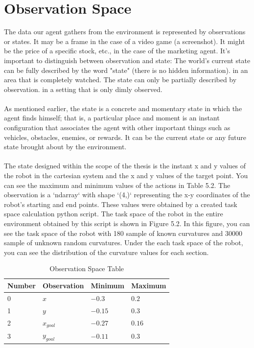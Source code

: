 \documentclass[12pt,twoside,a4]{mwbk}
\begin{document}
\section{Observation Space}
The data our agent gathers from the environment is represented by observations or states. It may be a frame in the case of a video game (a screenshot). It might be the price of a specific stock, etc., in the case of the marketing agent. It's important to distinguish between observation and state: The world's current state can be fully described by the word "state" (there is no hidden information). in an area that is completely watched. The state can only be partially described by observation. in a setting that is only dimly observed.
\\ \\
As mentioned earlier, the state is a concrete and momentary state in which the agent finds himself; that is, a particular place and moment is an instant configuration that associates the agent with other important things such as vehicles, obstacles, enemies, or rewards. It can be the current state or any future state brought about by the environment. 
\\ \\
The state designed within the scope of the thesis is the instant x and y values of the robot in the cartesian system and the x and y values of the target point. You can see the maximum and minimum values of the actions in Table 5.2. The observation is a `ndarray` with shape `(4,)` representing the x-y coordinates of the robot's starting and end points. These values were obtained by a created task space calculation python script. The task space of the robot in the entire environment obtained by this script is shown in Figure 5.2. In this figure, you can see the task space of the robot with 180 sample of known curvatures and 30000 sample of unknown random curvatures. Under the each task space of the robot, you can see the distribution of the curvature values for each section. 
\begin{table}[h!]
\centering
\begin{tabular}{||c c c c||} 
 \hline \hline
 \textbf{Number} & \textbf{Observation} & \textbf{Minimum} & \textbf{Maximum} \\ [0.5ex] 
    \hline\hline
    \multicolumn{1}{|l|}{0} & \multicolumn{1}{l|}{$x$} & \multicolumn{1}{l|}{$-0.3$} & \multicolumn{1}{l|}{$0.2$} \\ \hline
    \multicolumn{1}{|l|}{1} & \multicolumn{1}{l|}{$y$} & \multicolumn{1}{l|}{$-0.15$} & \multicolumn{1}{l|}{$0.3$} \\ \hline
    \multicolumn{1}{|l|}{2} & \multicolumn{1}{l|}{$x_{goal}$} & \multicolumn{1}{l|}{$-0.27$} & \multicolumn{1}{l|}{$0.16$} \\ \hline
    \multicolumn{1}{|l|}{3} & \multicolumn{1}{l|}{$y_{goal}$} & \multicolumn{1}{l|}{$-0.11$} & \multicolumn{1}{l|}{$0.3$} \\ \hline
\end{tabular}
\caption{Observation Space Table}
\end{table}
\end{document}

